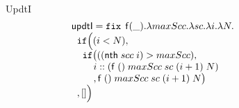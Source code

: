 \documentclass[a4paper,11pt]{article}
\theoremstyle{definition}
\begin{document}
\begin{figure}
\[\begin{array}{l}
\end{array}
\]


UpdtI
\[
\begin{array}{l}
 \mathsf{updtI} = \mathop{\mathtt{fix}} \;  \mathsf{f}(\_). \lambda maxScc. \lambda sc. \lambda
  i. \lambda N. \\
 \hspace{.2cm} \mathtt{if}   \Big (   (i < N)  ,  \\
\hspace{0.4cm}  \mathtt{if} \big( ( ( \mathsf{nth} \; scc \; i)  >  maxScc  ) ,       \\
 \hspace{0.8cm}   i :: ( \mathsf{f}  \; () \; maxScc \; sc
  \; (i+1) \; N  )\\
 \hspace{0.8cm} , \mathsf{f}  \; () \; maxScc \; sc
  \; (i+1) \; N  \big )  \\
\hspace{0.2cm}   ,  [] \Big ) \\
\end{array}
\]
\end{figure}
\end{document}
